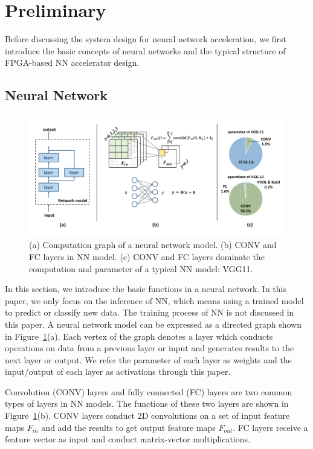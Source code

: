 \section{Preliminary}\label{sec:preliminary}

Before discussing the system design for neural network acceleration, we first introduce the basic concepts of neural networks and the typical structure of FPGA-based NN accelerator design.

\subsection{Neural Network}

\begin{figure}[ht]
    \centering
    \includegraphics[width=1.0\columnwidth]{fig/cnn_preliminary.pdf}
    \caption{(a) Computation graph of a neural network model. (b) CONV and FC layers in NN model. (c) CONV and FC layers dominate the computation and parameter of a typical NN model: VGG11.}
    \label{fig:cnn_preliminary}
\end{figure}

In this section, we introduce the basic functions in a neural network. In this paper, we only focus on the inference of NN, which means using a trained model to predict or classify new data. The training process of NN is not discussed in this paper. A neural network model can be expressed as a directed graph shown in Figure~\ref{fig:cnn_preliminary}(a). Each vertex of the graph denotes a layer which conducts operations on data from a previous layer or input and generates results to the next layer or output. We refer the parameter of each layer as weights and the input/output of each layer as activations through this paper. 

Convolution (CONV) layers and fully connected (FC) layers are two common types of layers in NN models. The functions of these two layers are shown in Figure~\ref{fig:cnn_preliminary}(b). CONV layers conduct 2D convolutions on a set of input feature maps $F_{in}$ and add the results to get output feature maps $F_{out}$. FC layers receive a feature vector as input and conduct matrix-vector multiplications.

